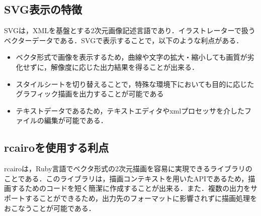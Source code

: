\subsection{SVG表示の特徴}
SVGは，XMLを基盤とする2次元画像記述言語であり．イラストレーターで扱うベクターデータである\cite{SVG}．SVGで表示することで，以下のような利点がある．

\begin{itemize}
\item ベクタ形式で画像を表示するため，曲線や文字の拡大・縮小しても画質が劣化せずに，解像度に応じた出力結果を得ることが出来る．
\item スタイルシートを切り替えることで，特殊な環境下においても目的に応じたグラフィック描画を出力することが可能である
\item テキストデータであるため，テキストエディタやxmlプロセッサを介したファイルの編集が可能である．
\end{itemize}
\subsection{rcairoを使用する利点}
rcairoは，Ruby言語でベクタ形式の2次元描画を容易に実現できるライブラリのことである．このライブラリは，描画コンテキストを用いたAPIであるため，描画するためのコードを短く簡潔に作成することが出来る．また．複数の出力をサポートすることができるため，出力先のフォーマットに影響されずに描画処理をおこなうことが可能である\cite{rcairo}．

